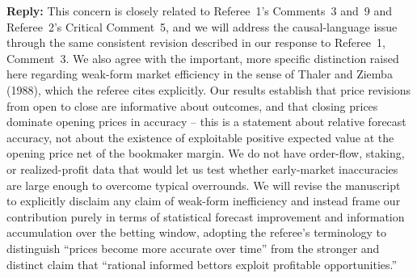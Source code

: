 \documentclass[letterpaper,12pt]{article}
\newcounter{b}
\newcommand{\Reply}[1]{\par\noindent\textbf{Reply:} #1}
\begin{document}
\begin{enumerate}
\Reply{This concern is closely related to Referee~1's Comments~3 and~9 and Referee~2's Critical Comment~5, and we will address the causal-language issue through the same consistent revision described in our response to Referee~1, Comment~3. We also agree with the important, more specific distinction raised here regarding weak-form market efficiency in the sense of Thaler and Ziemba (1988), which the referee cites explicitly. Our results establish that price revisions from open to close are informative about outcomes, and that closing prices dominate opening prices in accuracy -- this is a statement about relative forecast accuracy, not about the existence of exploitable positive expected value at the opening price net of the bookmaker margin. We do not have order-flow, staking, or realized-profit data that would let us test whether early-market inaccuracies are large enough to overcome typical overrounds. We will revise the manuscript to explicitly disclaim any claim of weak-form inefficiency and instead frame our contribution purely in terms of statistical forecast improvement and information accumulation over the betting window, adopting the referee's terminology to distinguish ``prices become more accurate over time'' from the stronger and distinct claim that ``rational informed bettors exploit profitable opportunities.''}


\end{enumerate}
\end{document}
